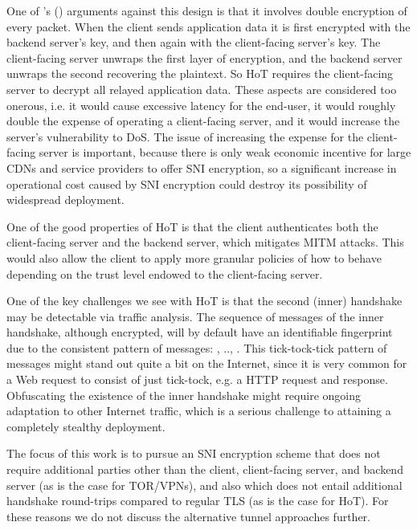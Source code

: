 One of \citeauthor{rfc8744-issues}'s (\citeyear{rfc8744-issues}) arguments against this design is that it involves double encryption of every packet. When the client sends application data it is first encrypted with the backend server's key, and then again with the client-facing server's key. The client-facing server unwraps the first layer of encryption, and the backend server unwraps the second recovering the plaintext. So \ac{HoT} requires the client-facing server to decrypt all relayed application data. These aspects are considered too onerous, i.e. it would cause excessive latency for the end-user, it would roughly double the expense of operating a client-facing server, and it would increase the server's vulnerability to \ac{DoS}. The issue of increasing the expense for the client-facing server is important, because there is only weak economic incentive for large \acp{CDN} and service providers to offer \ac{SNI} encryption, so a significant increase in operational cost caused by \ac{SNI} encryption could destroy its possibility of widespread deployment.

One of the good properties of \ac{HoT} is that the client authenticates both the client-facing server and the backend server, which mitigates \ac{MITM} attacks. This would also allow the client to apply more granular policies of how to behave depending on the trust level endowed to the client-facing server.

One of the key challenges we see with \ac{HoT} is that the second (inner) handshake may be detectable via traffic analysis. The sequence of messages of the inner handshake, although encrypted, will by default have an identifiable fingerprint due to the consistent pattern of messages: , .., . This tick-tock-tick pattern of messages might stand out quite a bit on the Internet, since it is very common for a Web request to consist of just tick-tock, e.g. a \ac{HTTP} request and response.
Obfuscating the existence of the inner handshake might require ongoing adaptation to other Internet traffic, which is a serious challenge to attaining a completely stealthy deployment.

The focus of this work is to pursue an \ac{SNI} encryption scheme that does not
require additional parties other than the client, client-facing server, and backend server (as is the case for TOR/\ac{VPN}s),
and also which does not entail additional handshake round-trips compared to regular \ac{TLS} (as is the case for \ac{HoT}).
For these reasons we do not discuss the alternative tunnel approaches further.
